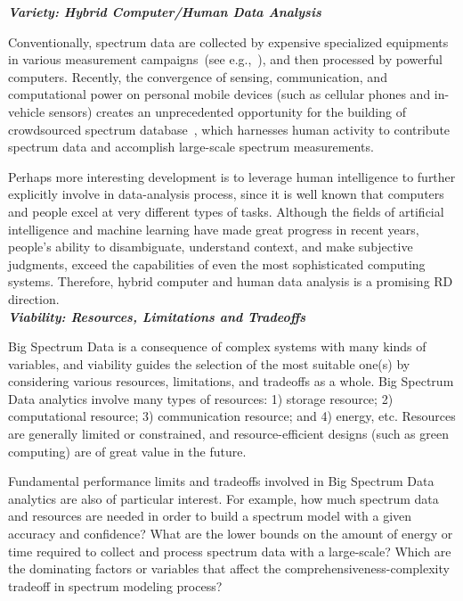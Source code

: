 \documentclass[12pt,draftcls,journal,letterpaper,oneside,onecolumn]{IEEEtran}
\begin{document}
\textbf{\emph{Variety: Hybrid Computer/Human Data Analysis}}

Conventionally, spectrum data are collected by expensive specialized equipments in various measurement campaigns~(see e.g.,~\cite{Spectrum_prediction,Spectrum_models}), and then processed by powerful computers. Recently, the convergence of sensing, communication, and computational power on personal mobile devices (such as cellular phones and in-vehicle sensors) creates an unprecedented opportunity for the building of crowdsourced spectrum database~\cite{JSAC-D2D}, which harnesses human activity to contribute spectrum data and accomplish large-scale spectrum measurements.

Perhaps more interesting development is to leverage human intelligence to further explicitly involve in data-analysis process, since it is well known that computers and people excel at very different types of tasks. Although the fields of artificial intelligence and machine learning have made great progress in recent years, people's ability to disambiguate, understand context, and make subjective judgments, exceed the capabilities of even the most sophisticated computing systems. Therefore, hybrid computer and human data analysis is a promising RD direction.
\\

\textbf{\emph{Viability: Resources, Limitations and Tradeoffs}}

Big Spectrum Data is a consequence of complex systems with many kinds of variables, and viability guides the selection of the most suitable one(s) by considering various resources, limitations, and tradeoffs as a whole. Big Spectrum Data analytics involve many types of resources: 1) storage resource; 2) computational resource; 3) communication resource; and 4) energy, etc. Resources are generally limited or constrained, and resource-efficient designs (such as green computing) are of great value in the future.

Fundamental performance limits and tradeoffs involved in Big Spectrum Data analytics are also of particular interest. For example, how much spectrum data and resources are needed in order to build a spectrum model with a given accuracy and confidence? What are the lower bounds on the amount of energy or time required to collect and process spectrum data with a large-scale? Which are the dominating factors or variables that affect the comprehensiveness-complexity tradeoff in spectrum modeling process?
\\
\end{document}
